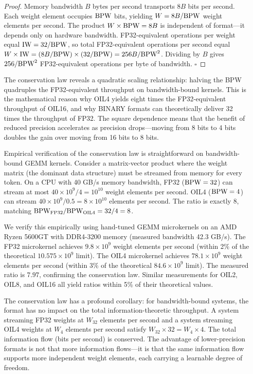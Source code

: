 \begin{proof}
Memory bandwidth $B$ bytes per second transports $8B$ bits per second. Each weight element occupies $\textnormal{BPW}$ bits, yielding $W = 8B / \textnormal{BPW}$ weight elements per second. The product $W \times \textnormal{BPW} = 8B$ is independent of format---it depends only on hardware bandwidth. FP32-equivalent operations per weight equal $\mathrm{IW} = 32 / \textnormal{BPW}$, so total FP32-equivalent operations per second equal $W \times \mathrm{IW} = (8B / \textnormal{BPW}) \times (32 / \textnormal{BPW}) = 256B / \textnormal{BPW}^2$. Dividing by $B$ gives $256 / \textnormal{BPW}^2$ FP32-equivalent operations per byte of bandwidth. $\square$
\end{proof}

The conservation law reveals a quadratic scaling relationship: halving the BPW quadruples the FP32-equivalent throughput on bandwidth-bound kernels. This is the mathematical reason why OIL4 yields eight times the FP32-equivalent throughput of OIL16, and why BINARY formats can theoretically deliver 32 times the throughput of FP32. The square dependence means that the benefit of reduced precision accelerates as precision drops---moving from 8 bits to 4 bits doubles the gain over moving from 16 bits to 8 bits.

Empirical verification of the conservation law is straightforward on bandwidth-bound GEMM kernels. Consider a matrix-vector product where the weight matrix (the dominant data structure) must be streamed from memory for every token. On a CPU with 40 GB/s memory bandwidth, FP32 ($\textnormal{BPW} = 32$) can stream at most $40 \times 10^9 / 4 = 10^{10}$ weight elements per second. OIL4 ($\textnormal{BPW} = 4$) can stream $40 \times 10^9 / 0.5 = 8 \times 10^{10}$ elements per second. The ratio is exactly $8$, matching $\textnormal{BPW}_{\text{FP32}} / \textnormal{BPW}_{\text{OIL4}} = 32 / 4 = 8$.

We verify this empirically using hand-tuned GEMM microkernels on an AMD Ryzen 5600GT with DDR4-3200 memory (measured bandwidth 42.3 GB/s). The FP32 microkernel achieves $9.8 \times 10^9$ weight elements per second (within 2\% of the theoretical $10.575 \times 10^9$ limit). The OIL4 microkernel achieves $78.1 \times 10^9$ weight elements per second (within 3\% of the theoretical $84.6 \times 10^9$ limit). The measured ratio is $7.97$, confirming the conservation law. Similar measurements for OIL2, OIL8, and OIL16 all yield ratios within 5\% of their theoretical values.

The conservation law has a profound corollary: for bandwidth-bound systems, the format has no impact on the total information-theoretic throughput. A system streaming FP32 weights at $W_{32}$ elements per second and a system streaming OIL4 weights at $W_4$ elements per second satisfy $W_{32} \times 32 = W_4 \times 4$. The total information flow (bits per second) is conserved. The advantage of lower-precision formats is not that more information flows---it is that the same information flow supports more independent weight elements, each carrying a learnable degree of freedom.

